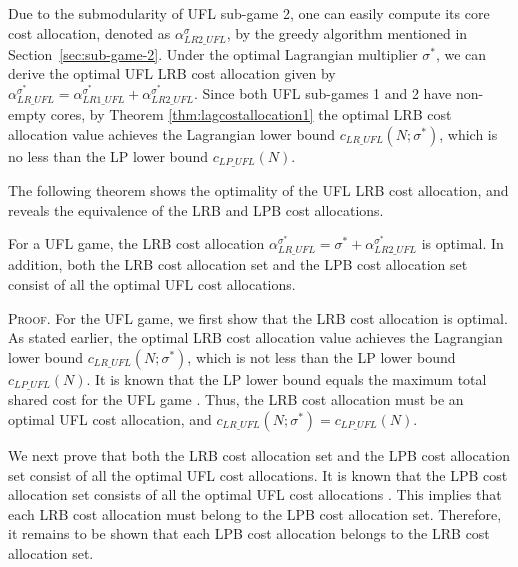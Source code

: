 \documentclass[ijoc,nonblindrev]{informs3} %
\begin{document}
Due to the submodularity of UFL sub-game 2, one can easily compute its core cost allocation, denoted as $\alpha_{LR2\_UFL}^{\sigma}$, by the greedy algorithm mentioned in Section~\ref{sec:sub-game-2}. Under the optimal Lagrangian multiplier $\sigma^*$, we can derive the optimal UFL LRB cost allocation given by $\alpha_{LR\_UFL}^{\sigma^*} = \alpha_{LR1\_UFL}^{\sigma^*} + \alpha_{LR2\_UFL}^{\sigma^*}$.
Since both UFL sub-games 1 and 2 have non-empty cores, by Theorem \ref{thm:lagcostallocation1} the optimal LRB cost allocation value achieves the Lagrangian lower bound $c_{LR\_UFL}(N;\sigma^*)$,
which is no less than the LP lower bound $c_{LP\_UFL}(N)$.

The following theorem shows the optimality of the UFL LRB cost allocation, and reveals the equivalence of the LRB and LPB cost allocations.


\begin{theorem}\label{lemma:lpbequallrbufl}
For a UFL game, the LRB cost allocation $\alpha_{LR\_UFL}^{\sigma^*} = \sigma^* + \alpha_{LR2\_UFL}^{\sigma^*}$ is optimal. In addition, both the LRB cost allocation set and the LPB cost allocation set consist of all the optimal UFL cost allocations.
\end{theorem}
{\scshape Proof.}
For the UFL game, we first show that the LRB cost allocation is optimal. As stated earlier, the optimal LRB cost allocation value achieves the Lagrangian lower bound $c_{LR\_UFL}(N;\sigma^*)$, which is not less than the LP lower bound $c_{LP\_UFL}(N)$. It is known that the LP lower bound equals the maximum total shared cost for the UFL game \citep{Kolen1983FacilityLocationGame,Goemans2000FacilityLocationGames}. Thus, the LRB cost allocation must be an optimal UFL cost allocation, and $c_{LR\_UFL}(N;\sigma^*)=c_{LP\_UFL}(N)$.

We next prove that both the LRB cost allocation set and the LPB cost allocation set consist of all the optimal UFL cost allocations. It is known that the LPB cost allocation set consists of all the optimal UFL cost allocations \citep{Goemans2000FacilityLocationGames}. This implies that each LRB cost allocation must belong to the LPB cost allocation set. Therefore, it remains to be shown that each LPB cost allocation belongs to the LRB cost allocation set.
\end{document}
